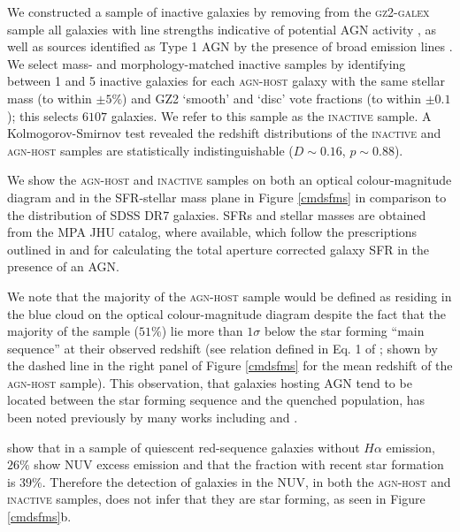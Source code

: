 \documentclass[useAMS,usenatbib]{mn2e}
\def\changed    {\color{nc} }
\def\newref    {\color{new} }
\begin{document}
We constructed a sample of inactive galaxies by removing from the \textsc{gz2-galex} sample {\changed all galaxies with line strengths indicative of potential AGN activity \citep*{Kauff03b}}, as well as sources identified as Type 1 AGN by the presence of broad emission lines \citep{Oh15}. {\changed We select mass- and morphology-matched inactive samples by identifying between 1 and 5 inactive galaxies for each \textsc{agn-host} galaxy with the same stellar mass (to within $\pm5\%$) and GZ2 `smooth' and `disc' vote fractions (to within $\pm 0.1$); this selects $6107$ galaxies.} We refer to this sample as the \textsc{inactive} sample. A Kolmogorov-Smirnov test revealed the redshift distributions of the \textsc{inactive} and \textsc{agn-host} samples are statistically indistinguishable ($D \sim 0.16$, $p \sim 0.88$). 


{\newref We show the \textsc{agn-host} and \textsc{inactive}  samples on both an optical colour-magnitude diagram and in the SFR-stellar mass plane in Figure \ref{cmdsfms} in comparison to the distribution of SDSS DR7 galaxies. SFRs and stellar masses are obtained from the MPA JHU catalog, where available, which follow the prescriptions outlined in \cite{Brinch04} and \cite{Salim07} for calculating the total aperture corrected galaxy SFR in the presence of an AGN. 

We note that the majority of the \textsc{agn-host} sample would be defined as residing in the blue cloud on the optical colour-magnitude diagram despite the fact that the majority of the sample ($51\%$) lie more than $1\sigma$ below the star forming ``main sequence'' at their observed redshift (see relation defined in Eq. 1 of \cite{Peng10}; shown by the dashed line in the right panel of Figure \ref{cmdsfms} for the mean redshift of the \textsc{agn-host} sample). This observation, that galaxies hosting AGN tend to be located between the star forming sequence and the quenched population, has been noted previously by many works including \citet{Salim07,Sch2010, Shimzu15} and \citet{Ellison16}. }

{\newref \cite{Ko13} show that in a sample of quiescent red-sequence galaxies without $H\alpha$ emission, $26\%$ show NUV excess emission and that the fraction with recent star formation is $39\%$. Therefore the detection of galaxies in the NUV, in both the \textsc{agn-host} and \textsc{inactive} samples, does not infer that they are star forming, as seen in Figure \ref{cmdsfms}b.}
\end{document}
